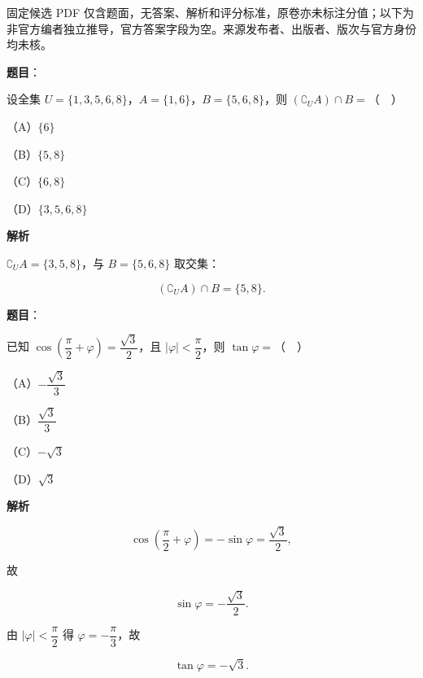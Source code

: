 

\begin{gktip}
固定候选 PDF 仅含题面，无答案、解析和评分标准，原卷亦未标注分值；以下为非官方编者独立推导，官方答案字段为空。来源发布者、出版者、版次与官方身份均未核。
\end{gktip}

\begin{answer}

\textbf{题目}：

设全集 $U=\{1,3,5,6,8\}$，$A=\{1,6\}$，$B=\{5,6,8\}$，则 $(\complement_UA)\cap B=$（　）

（A）$\{6\}$

（B）$\{5,8\}$

（C）$\{6,8\}$

（D）$\{3,5,6,8\}$

\textbf{解析}

$\complement_UA=\{3,5,8\}$，与 $B=\{5,6,8\}$ 取交集：

\nopagebreak[4]
\[(\complement_UA)\cap B=\{5,8\}.\]


\end{answer}
\begin{answer}

\textbf{题目}：

已知 $\cos\left(\dfrac{\pi}{2}+\varphi\right)=\dfrac{\sqrt3}{2}$，且 $|\varphi|<\dfrac{\pi}{2}$，则 $\tan\varphi=$（　）

（A）$-\dfrac{\sqrt3}{3}$

（B）$\dfrac{\sqrt3}{3}$

（C）$-\sqrt3$

（D）$\sqrt3$

\textbf{解析}

\nopagebreak[4]
\[\cos\left(\frac{\pi}{2}+\varphi\right)=-\sin\varphi=\frac{\sqrt3}{2},\]

故

\nopagebreak[4]
\[\sin\varphi=-\frac{\sqrt3}{2}.\]

由 $|\varphi|<\dfrac{\pi}{2}$ 得 $\varphi=-\dfrac{\pi}{3}$，故

\nopagebreak[4]
\[\tan\varphi=-\sqrt3.\]


\end{answer}
